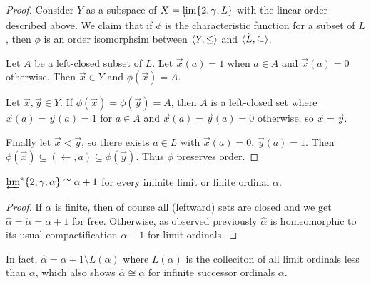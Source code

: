\documentclass[11pt]{article}
\newcommand{\vect}{\vec}
\begin{document}
  \begin{proof}
    Consider \(Y\) as a subspace of \(X=\varprojlim \{2, \gamma, L\}\) with
    the linear order described above. We claim that if \(\phi\) is the
    characteristic function for a subset of \(L\), then \(\phi\)
    is an order isomorphsim between \(\langle Y,\leq\rangle\) and
    \(\langle\hat L,\subseteq\rangle\).

    Let \(A\) be a left-closed subset of \(L\). Let \(\vect x(a)=1\) when
    \(a\in A\) and \(\vect x(a)=0\) otherwise. Then \(\vect x\in Y\) and
    \(\phi(\vect x)=A\).

    Let \(\vect x,\vect y\in Y\). If
    \(\phi(\vect x)=\phi(\vect y)=A\), then \(A\) is a
    left-closed set where \(\vect x(a)=\vect y(a)=1\) for \(a\in A\)
    and \(\vect x(a)=\vect y(a)=0\) otherwise, so \(\vect x=\vect y\).

    Finally let \(\vect x<\vect y\), so there exists \(a\in L\) with
    \(\vect x(a)=0\), \(\vect y(a)=1\). Then
    \(
      \phi(\vect x)
        \subseteq
      (\leftarrow,a)
        \subseteq
      \phi(\vect y)
    \). Thus \(\phi\) preserves order.
  \end{proof}

  \begin{corollary}
    \(
      \varprojlim^\star \{2, \gamma, \alpha\}
      \cong
      \alpha+1
    \)
    for every infinite limit or finite ordinal \(\alpha\).
  \end{corollary}

  \begin{proof}
    If \(\alpha\) is finite, then of course all (leftward) sets are
    closed and we get \(\hat\alpha=\check\alpha=\alpha+1\) for free.
    Otherwise, as observed previously \(\hat\alpha\)
    is homeomorphic to its usual compactification \(\alpha+1\) for
    limit ordinals.
  \end{proof}

  In fact, \(\hat\alpha=\alpha+1\setminus L(\alpha)\) where \(L(\alpha)\)
  is the colleciton of all limit ordinals less than \(\alpha\), which also
  shows \(\hat\alpha\cong\alpha\) for infinite successor ordinals \(\alpha\).

\newpage


\end{document}
